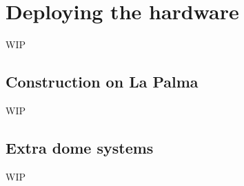 \section{Deploying the hardware}
\label{sec:hardware}
\begin{colsection}


\begin{colsection}

WIP

\end{colsection}


\subsection{Construction on La Palma}
\label{sec:construction}
\begin{colsection}

WIP

\end{colsection}


\subsection{Extra dome systems}
\label{sec:arduino}
\begin{colsection}

WIP

\end{colsection}


\end{colsection}


\newpage
